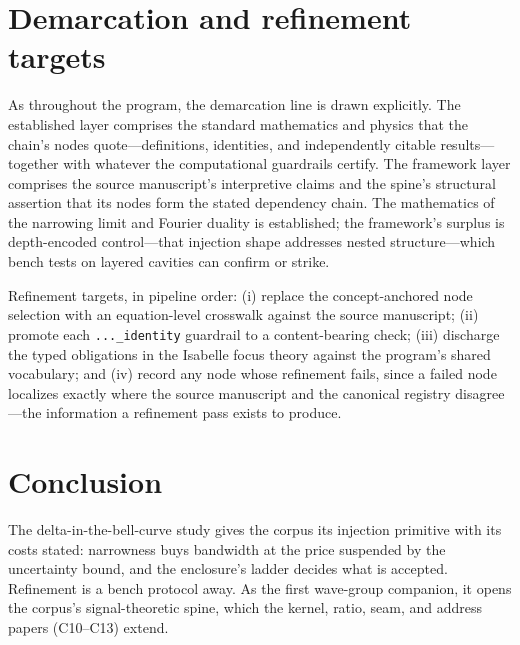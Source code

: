 \documentclass[11pt]{article}
\theoremstyle{remark}
\begin{document}
\section{Demarcation and refinement targets}
\label{sec:demarc}

As throughout the program, the demarcation line is drawn explicitly. The established layer comprises the standard mathematics and physics that the chain's nodes quote---definitions, identities, and independently citable results---together with whatever the computational guardrails certify. The framework layer comprises the source manuscript's interpretive claims and the spine's structural assertion that its nodes form the stated dependency chain. The mathematics of the narrowing limit and Fourier duality is established; the framework's surplus is depth-encoded control---that injection shape addresses nested structure---which bench tests on layered cavities can confirm or strike.

Refinement targets, in pipeline order: (i) replace the concept-anchored node selection with an equation-level crosswalk against the source manuscript; (ii) promote each \texttt{...\_identity} guardrail to a content-bearing check; (iii) discharge the typed obligations in the Isabelle focus theory against the program's shared vocabulary; and (iv) record any node whose refinement fails, since a failed node localizes exactly where the source manuscript and the canonical registry disagree---the information a refinement pass exists to produce.

\section{Conclusion}
\label{sec:conc}

The delta-in-the-bell-curve study gives the corpus its injection primitive with its costs stated: narrowness buys bandwidth at the price suspended by the uncertainty bound, and the enclosure's ladder decides what is accepted. Refinement is a bench protocol away. As the first wave-group companion, it opens the corpus's signal-theoretic spine, which the kernel, ratio, seam, and address papers (C10--C13) extend.
\end{document}
